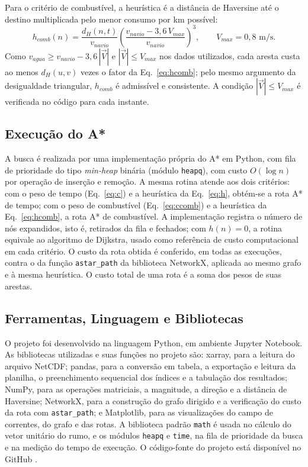 \documentclass[conference]{IEEEtran}
\begin{document}
Para o critério de combustível, a heurística é a distância de Haversine até o destino multiplicada pelo menor consumo por km possível:
\begin{equation}
h_{comb}(n) = \frac{d_H(n,t)}{v_{navio}}\left(\frac{v_{navio} - 3{,}6\,V_{max}}{v_{navio}}\right)^{3}, \qquad V_{max} = 0{,}8 \text{ m/s}.
\label{eq:hcomb}
\end{equation}
Como $v_{agua} \geq v_{navio} - 3{,}6\,|\vec{V}|$ e $|\vec{V}| \leq V_{max}$ nos dados utilizados, cada aresta custa ao menos $d_H(u,v)$ vezes o fator da Eq.~\ref{eq:hcomb}; pelo mesmo argumento da desigualdade triangular, $h_{comb}$ é admissível e consistente. A condição $|\vec{V}| \leq V_{max}$ é verificada no código para cada instante.

\subsection{Execução do A*}
A busca é realizada por uma implementação própria do A* em Python, com fila de prioridade do tipo \textit{min-heap} binária (módulo \texttt{heapq}), com custo $O(\log n)$ por operação de inserção e remoção. A mesma rotina atende aos dois critérios: com o peso de tempo (Eq.~\ref{eq:c}) e a heurística da Eq.~\ref{eq:h}, obtém-se a rota A* de tempo; com o peso de combustível (Eq.~\ref{eq:ccomb}) e a heurística da Eq.~\ref{eq:hcomb}, a rota A* de combustível. A implementação registra o número de nós expandidos, isto é, retirados da fila e fechados; com $h(n) = 0$, a rotina equivale ao algoritmo de Dijkstra, usado como referência de custo computacional em cada critério. O custo da rota obtida é conferido, em todas as execuções, contra o da função \texttt{astar\_path} da biblioteca NetworkX, aplicada ao mesmo grafo e à mesma heurística. O custo total de uma rota é a soma dos pesos de suas arestas.

\subsection{Ferramentas, Linguagem e Bibliotecas}
O projeto foi desenvolvido na linguagem Python, em ambiente Jupyter Notebook. As bibliotecas utilizadas e suas funções no projeto são: xarray, para a leitura do arquivo NetCDF; pandas, para a conversão em tabela, a exportação e leitura da planilha, o preenchimento sequencial dos índices e a tabulação dos resultados; NumPy, para as operações matriciais, a magnitude, a direção e a distância de Haversine; NetworkX, para a construção do grafo dirigido e a verificação do custo da rota com \texttt{astar\_path}; e Matplotlib, para as visualizações do campo de correntes, do grafo e das rotas. A biblioteca padrão \texttt{math} é usada no cálculo do vetor unitário do rumo, e os módulos \texttt{heapq} e \texttt{time}, na fila de prioridade da busca e na medição do tempo de execução. O c\'odigo-fonte do projeto est\'a dispon\'ivel no GitHub \cite{github}.
\end{document}
